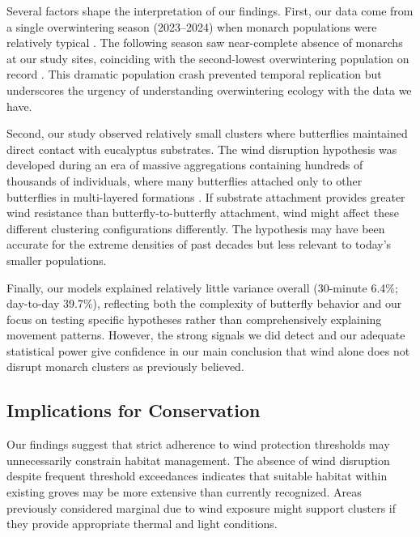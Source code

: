 Several factors shape the interpretation of our findings. First, our data come from a single overwintering season (2023--2024) when monarch populations were relatively typical \parencite{xercessocietyWesternMonarchThanksgiving2025}. The following season saw near-complete absence of monarchs at our study sites, coinciding with the second-lowest overwintering population on record \parencite{xercessocietyWesternMonarchButterfly2025}. This dramatic population crash prevented temporal replication but underscores the urgency of understanding overwintering ecology with the data we have.

Second, our study observed relatively small clusters where butterflies maintained direct contact with eucalyptus substrates. The wind disruption hypothesis was developed during an era of massive aggregations containing hundreds of thousands of individuals, where many butterflies attached only to other butterflies in multi-layered formations \parencite{leongMicroenvironmentalFactorsAssociated1990,browerMonarchButterflyClusters2008}. If substrate attachment provides greater wind resistance than butterfly-to-butterfly attachment, wind might affect these different clustering configurations differently. The hypothesis may have been accurate for the extreme densities of past decades but less relevant to today's smaller populations.

Finally, our models explained relatively little variance overall (30-minute 6.4\%; day-to-day 39.7\%), reflecting both the complexity of butterfly behavior and our focus on testing specific hypotheses rather than comprehensively explaining movement patterns. However, the strong signals we did detect and our adequate statistical power give confidence in our main conclusion that wind alone does not disrupt monarch clusters as previously believed.

\subsection{Implications for Conservation}

Our findings suggest that strict adherence to wind protection thresholds may unnecessarily constrain habitat management. The absence of wind disruption despite frequent threshold exceedances indicates that suitable habitat within existing groves may be more extensive than currently recognized. Areas previously considered marginal due to wind exposure might support clusters if they provide appropriate thermal and light conditions.

